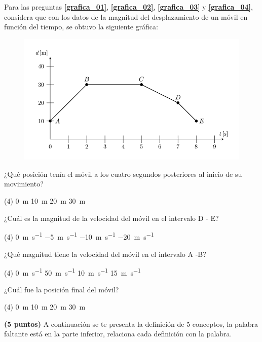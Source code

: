 \documentclass[12pt, letter]{exam}
\begin{document}
\begin{questions}
    Para las preguntas \textbf{\ref{grafica_01}}, \textbf{\ref{grafica_02}}, \textbf{\ref{grafica_03}} y \textbf{\ref{grafica_04}}, considera que con los datos de la magnitud del desplazamiento de un móvil en función del tiempo, se obtuvo la siguiente gráfica:
    \begin{figure}[H]
        \centering
        \includegraphics[scale=1.5]{Imagenes/Examen_Grafica_01.png}
    \end{figure}
    \question \label{grafica_01} ¿Qué posición tenía el móvil a los cuatro segundos posteriores al inicio de su movimiento?
    \begin{tasks}(4)
        \task \SI{0}{\meter}
        \task \SI{10}{\meter}
        \task \SI{20}{\meter}
        \task \SI{30}{\meter}
    \end{tasks}
    \question \label{grafica_02} ¿Cuál es la magnitud de la velocidad del móvil en el intervalo D - E?
    \begin{tasks}(4)
        \task \SI{0}{\meter\per\second}
        \task \SI{-5}{\meter\per\second}
        \task \SI{-10}{\meter\per\second}
        \task \SI{-20}{\meter\per\second}
    \end{tasks}
    \question \label{grafica_03} ¿Qué magnitud tiene la velocidad del móvil en el intervalo A -B?
    \begin{tasks}(4)
        \task \SI{0}{\meter\per\second}
        \task \SI{50}{\meter\per\second}
        \task \SI{10}{\meter\per\second}
        \task \SI{15}{\meter\per\second}
    \end{tasks}
    \question \label{grafica_04} ¿Cuál fue la posición final del móvil?
    \begin{tasks}(4)
        \task \SI{0}{\meter}
        \task \SI{10}{\meter}
        \task \SI{20}{\meter}
        \task \SI{30}{\meter}
    \end{tasks}
    \question \textbf{(5 puntos)} A continuación se te presenta la definición de 5 conceptos, la palabra faltante está en la parte inferior, relaciona cada definición con la palabra.
    \begin{parts}

\end{parts}
\end{questions}
\end{document}
